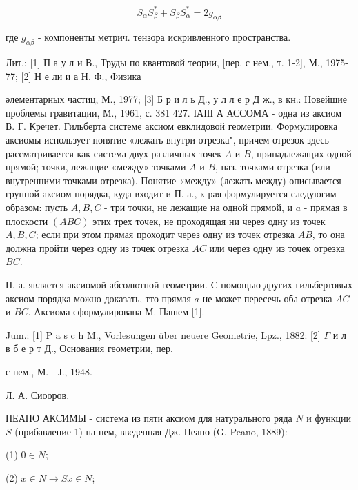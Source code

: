 \documentclass[10pt]{article}
\begin{document}
\[

S_{\alpha} S_{\beta}^{*}+S_{\beta} S_{\alpha}^{*}=2 g_{\alpha \beta}

\]



где $g_{\alpha \beta}$ - компоненты метрич. тензора искривленного пространства.



Лит.: [1] П а у л и В., Труды по квантовой теории, [пер. с нем., т. 1-2], М., 1975-77; [2] Н е ли и а Н. Ф., Физика

әлементарных частиц, М., 1977; [3] Б р и л ь Д., у л л е р Д ж., в кн.: Новейшие проблемы гравитации, М., 1961, с. 381 427. ІАІІІ А АССОМА - одна из аксиом В. Г. Кречет. Гильберта системе аксиом евклидовой геометрии. Формулировка аксиомы использует понятие «лежать внутри отрезка", причем отрезок здесь рассматривается как система двух различных точек $A$ и $B$, принадлежащих одной прямой; точки, лежащие «между» точками $A$ и $B$, наз. точками отрезка (или внутренними точками отрезка). Понятие «между» (лежать между) описывается группой аксиом порядка, куда входит и П. а., к-рая формулируется следуюгим образом: пусть $A, B, C$ - три точки, не лежащие на одной прямой, и $a$ - прямая в плоскости $(A B C)$ этих трех точек, не проходящая ни через одну из точек $A, B, C$; если при этом прямая проходит через одну из точек отрезка $A B$, то она должна пройти через одну из точек отрезка $A C$ или через одну из точек отрезка $B C$.



П. а. является аксиомой абсолютной геометрии. $\mathrm{C}$ помощью других гильбертовых аксиом порядка можно доказать, тто прямая $a$ не может пересечь оба отрезка $A C$ и $B C$. Аксиома сформулирована М. Пашем [1].



Jum.: [1] P a s c h M., Vorlesungen über neuere Geometrie, Lpz., 1882: [2] $\Gamma$ и л в б е р т Д., Основания геометрии, пер.

с нем., М. - Ј., 1948.

Л. А. Сиооров.



ПЕАНО АКС̆ИМЫ - система из пяти аксиом для натурального ряда $N$ и функции $S$ (прибавление 1) на нем, введенная Дж. Пеано (G. Peano, 1889):



(1) $0 \in N$;



(2) $x \in N \rightarrow S x \in N$;
\end{document}
